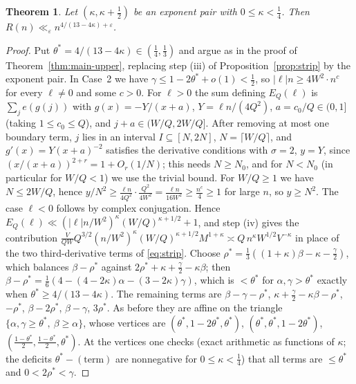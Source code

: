 \documentclass[11pt,reqno]{amsart}
\newtheorem{theorem}{Theorem}[section]
\theoremstyle{definition}
\newcommand{\eps}{\varepsilon}
\begin{document}
\begin{theorem}\label{thm:pairs}
Let $(\kappa,\kappa+\frac12)$ be an exponent pair with $0\le\kappa<\frac14$.
Then $R(n)\ll_\eps n^{4/(13-4\kappa)+\eps}$.
\end{theorem}
\begin{proof}
Put $\theta^*=4/(13-4\kappa)\in(\frac14,\frac13)$ and argue as in the proof
of Theorem~\ref{thm:main-upper}, replacing step (iii) of
Proposition~\ref{prop:strip} by the exponent pair.  In Case~2 we have
$\gamma\le1-2\theta^*+o(1)<\frac12$, so $|\ell|n\ge 4W^2\cdot n^{c}$ for
every $\ell\ne0$ and some $c>0$.  For $\ell>0$ the sum defining $E_Q(\ell)$
is $\sum_je(g(j))$ with $g(x)=-Y/(x+a)$, $Y=\ell n/(4Q^2)$,
$a=c_0/Q\in(0,1]$ (taking $1\le c_0\le Q$), and $j+a\in(W/Q,2W/Q]$.  After
removing at most one boundary term, $j$ lies in an interval
$I\subseteq[N,2N]$, $N=\lceil W/Q\rceil$, and
$g'(x)=Y(x+a)^{-2}$ satisfies the derivative conditions with $\sigma=2$,
$y=Y$, since $(x/(x+a))^{2+r}=1+O_r(1/N)$; this needs $N\ge N_0$, and for
$N<N_0$ (in particular for $W/Q<1$) we use the trivial bound.  For
$W/Q\ge1$ we have $N\le2W/Q$, hence
$y/N^2\ge\frac{\ell n}{4Q^2}\cdot\frac{Q^2}{4W^2}=\frac{\ell n}{16W^2}\ge
\frac{n^c}4\ge1$ for large $n$, so $y\ge N^2$.  The case $\ell<0$ follows by complex conjugation.  Hence
$E_Q(\ell)\ll(|\ell|n/W^2)^\kappa(W/Q)^{\kappa+1/2}+1$, and step (iv)
gives the contribution
$\frac V{QW}Q^{3/2}(n/W^2)^\kappa(W/Q)^{\kappa+1/2}M^{1+\kappa}\asymp
Q\,n^\kappa W^{1/2}V^{-\kappa}$ in place of the two third-derivative
terms of \eqref{eq:strip}.  Choose
$\rho^*=\frac13((1+\kappa)\beta-\kappa-\frac\gamma2)$, which balances
$\beta-\rho^*$ against $2\rho^*+\kappa+\frac\gamma2-\kappa\beta$; then
$\beta-\rho^*=\frac16(4-(4-2\kappa)\alpha-(3-2\kappa)\gamma)$, which is
$<\theta^*$ for $\alpha,\gamma>\theta^*$ exactly when
$\theta^*\ge4/(13-4\kappa)$.  The remaining terms are $\beta-\gamma-\rho^*$,
$\kappa+\frac\gamma2-\kappa\beta-\rho^*$, $-\rho^*$, $\beta-2\rho^*$, $\beta-\gamma$,
$3\rho^*$.  As before they are affine on the triangle
$\{\alpha,\gamma\ge\theta^*,\ \beta\ge\alpha\}$, whose vertices are
$(\theta^*,1-2\theta^*,\theta^*)$, $(\theta^*,\theta^*,1-2\theta^*)$,
$(\frac{1-\theta^*}2,\frac{1-\theta^*}2,\theta^*)$.  At the vertices one
checks (exact arithmetic as functions of $\kappa$; the deficits
$\theta^*-(\text{term})$ are nonnegative for $0\le\kappa<\frac14$) that
all terms are $\le\theta^*$ and $0<2\rho^*<\gamma$.
\end{proof}
\end{document}
